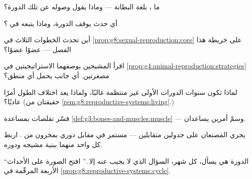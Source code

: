 \begin{exercise}[$\star$]\label{exo:g8:reproductive-systems:5}
ما ، بلغة البطانة --- وماذا يقول وصوله عن تلك
الدورة؟
\end{exercise}

\begin{exercise}[$\star$]\label{exo:g8:reproductive-systems:6}
أي حدث يوقف الدورة، وماذا يتبعه في ؟
\end{exercise}

\begin{exercise}[$\star\star$]\label{exo:g8:reproductive-systems:7}
أين تحدث الخطوات الثلاث في
\cref{prop:g8:sexual-reproduction:core} على خريطة هذا
الفصل --- عضوًا عضوًا؟
\end{exercise}

\begin{exercise}[$\star\star$]\label{exo:g8:reproductive-systems:8}
اقرأ المشيجين بوصفهما الاستراتيجيتين في
\cref{prop:g4:animal-reproduction:strategies} مصغرتين.
أي جانب يحمل أي منطق؟
\end{exercise}

\begin{exercise}[$\star\star$]\label{exo:g8:reproductive-systems:9}
لماذا تكون سنوات الدورات الأولى غير منتظمة غالبًا،
ولماذا يعد اختلاف الطول أمرًا عاديًا؟ (حقيقتان من
\cref{rem:g8:reproductive-systems:living}.)
\end{exercise}

\begin{exercise}[$\star\star$]\label{exo:g8:reproductive-systems:10}
فسّر تقلصات  بمساعدة
\cref{def:g3:bones-and-muscles:muscle} --- وسمّ أمرين
يساعدان.
\end{exercise}

\begin{exercise}[$\star\star$]\label{exo:g8:reproductive-systems:11}
يجري المصنعان على جدولين متقابلين --- مستمر في مقابل
دوري بمخزون من . اربط كل واحد منهما ببنية مشيجه
ودوره.
\end{exercise}

\begin{exercise}[$\star\star\star$]\label{exo:g8:reproductive-systems:12}
``الدورة هي  يسأل، كل شهر، السؤال الذي لا يجيب
عنه إلا .'' افتح الصورة على الأحداث الأربعة
المرقّمة في \cref{prop:g8:reproductive-systems:cycle}.
\end{exercise}

